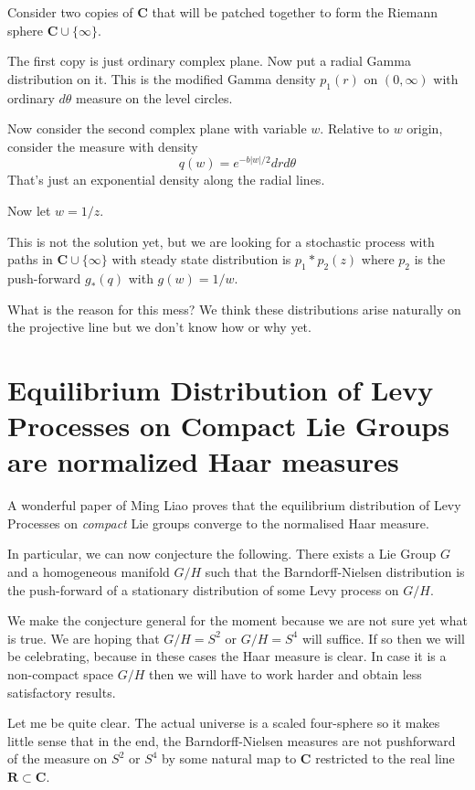 \documentclass{amsart}
\begin{document}
Consider two copies of $\mathbf{C}$ that will be patched together to form the Riemann sphere $\mathbf{C}\cup\{\infty\}$.

The first copy is just ordinary complex plane.  Now put a radial Gamma distribution on it.  This is the modified Gamma density $p_1(r)$ on $(0,\infty)$ with ordinary $d\theta$ measure on the level circles.

Now consider the second complex plane with variable $w$.  Relative to $w$ origin, consider the measure with density 
\[
q(w) = e^{-b|w|/2} dr d\theta
\]
That's just an exponential density along the radial lines.

Now let $w=1/z$.  

This is not the solution yet, but we are looking for a stochastic process with paths in $\mathbf{C}\cup\{\infty\}$ with steady state distribution is $p_1*p_2(z)$ where $p_2$ is the push-forward $g_*(q)$ with $g(w)=1/w$.

What is the reason for this mess?  We think these distributions arise naturally on the projective line but we don't know how or why yet.

\section{Equilibrium Distribution of Levy Processes on Compact Lie Groups are normalized Haar measures}

A wonderful paper of Ming Liao \cite{Liao04} proves that the equilibrium distribution of Levy Processes on {\em compact} Lie groups converge to the normalised Haar measure.  

In particular, we can now conjecture the following.  There exists a Lie Group $G$ and a homogeneous manifold $G/H$ such that the Barndorff-Nielsen distribution is the push-forward of a stationary distribution of some Levy process on $G/H$. 

We make the conjecture general for the moment because we are not sure yet what is true.  We are hoping that $G/H=S^2$ or $G/H=S^4$ will suffice.  If so then we will be celebrating, because in these cases the Haar measure is clear.  In case it is a non-compact space $G/H$ then we will have to work harder and obtain less satisfactory results.

Let me be quite clear.  The actual universe is a scaled four-sphere so it makes little sense that in the end, the Barndorff-Nielsen measures are not pushforward of the measure on $S^2$ or $S^4$ by some natural map to $\mathbf{C}$ restricted to the real line $\mathbf{R}\subset\mathbf{C}$.
\end{document}
